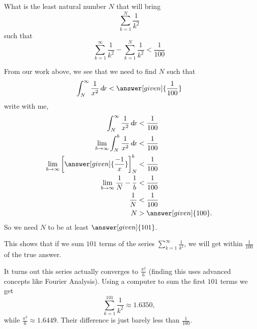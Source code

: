 \documentclass{ximera}
\begin{document}
\begin{example}
  What is the least natural number $N$ that will bring 
  \[
  \sum_{k=1}^N \frac{1}{k^2}
  \]
  such that
  \[
  \sum_{k=1}^\infty \frac{1}{k^2} - \sum_{k=1}^N \frac{1}{k^2} <
  \frac{1}{100}
  \]
  \begin{explanation}
    From our work above, we see that we need to find $N$ such that
    \[
    \int_N^\infty \frac{1}{x^2} \d x < \answer[given]{\frac{1}{100}}
    \]
    write with me,
    \begin{align*}
      \int_N^\infty \frac{1}{x^2} \d x &< \frac{1}{100}\\
      \lim_{b \to \infty} \int_N^b \frac{1}{x^2} \d x &< \frac{1}{100}\\
      \lim_{b \to \infty} \eval{\answer[given]{\frac{-1}{x}}}_N^b& < \frac{1}{100}\\
      \lim_{b \to \infty} \frac{1}{N} - \frac{1}{b}& < \frac{1}{100}\\
      \frac{1}{N} &< \frac{1}{100}\\
      N&>\answer[given]{100}.
    \end{align*}
    So we need $N$ to be at least $\answer[given]{101}$.
  \end{explanation}
\end{example}

This shows that if we sum $101$ terms of the series $\sum_{k=1}^\infty
\frac{1}{k^2}$, we will get within $\frac{1}{100}$ of the true answer.

It turns out this series actually converges to $\frac{\pi^2}{6}$
(finding this uses advanced concepts like Fourier Analysis).  Using a
computer to sum the first $101$ terms we get
\[
\sum_{k=1}^{101} \frac{1}{k^2} \approx 1.6350,
\]
while $\frac{\pi^2}{6} \approx 1.6449$.  Their difference is just
barely less than $\frac{1}{100}$.
\end{document}
